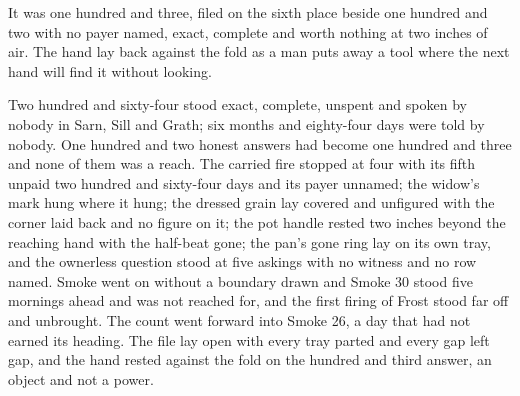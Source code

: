 It was one hundred and three, filed on the sixth place beside one hundred and two with no payer named, exact, complete and worth nothing at two inches of air. The hand lay back against the fold as a man puts away a tool where the next hand will find it without looking.

Two hundred and sixty-four stood exact, complete, unspent and spoken by nobody in Sarn, Sill and Grath; six months and eighty-four days were told by nobody. One hundred and two honest answers had become one hundred and three and none of them was a reach. The carried fire stopped at four with its fifth unpaid two hundred and sixty-four days and its payer unnamed; the widow's mark hung where it hung; the dressed grain lay covered and unfigured with the corner laid back and no figure on it; the pot handle rested two inches beyond the reaching hand with the half-beat gone; the pan's gone ring lay on its own tray, and the ownerless question stood at five askings with no witness and no row named. Smoke went on without a boundary drawn and Smoke 30 stood five mornings ahead and was not reached for, and the first firing of Frost stood far off and unbrought. The count went forward into Smoke 26, a day that had not earned its heading. The file lay open with every tray parted and every gap left gap, and the hand rested against the fold on the hundred and third answer, an object and not a power.
